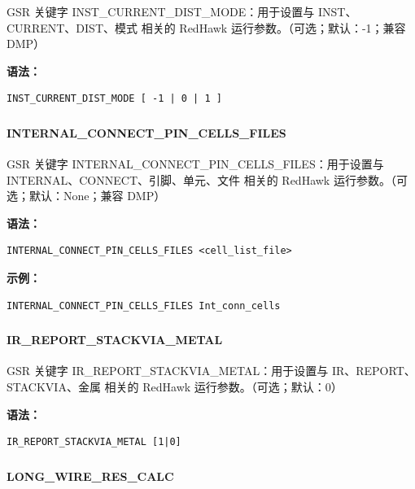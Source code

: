 GSR 关键字 INST_CURRENT_DIST_MODE：用于设置与 INST、CURRENT、DIST、模式 相关的 RedHawk 运行参数。（可选；默认：-1；兼容 DMP）

\textbf{语法：}
\begin{lstlisting}
INST_CURRENT_DIST_MODE [ -1 | 0 | 1 ]
\end{lstlisting}

\subsubsection{}
\paragraph*{INTERNAL_CONNECT_PIN_CELLS_FILES}

GSR 关键字 INTERNAL_CONNECT_PIN_CELLS_FILES：用于设置与 INTERNAL、CONNECT、引脚、单元、文件 相关的 RedHawk 运行参数。（可选；默认：None；兼容 DMP）

\textbf{语法：}
\begin{lstlisting}
INTERNAL_CONNECT_PIN_CELLS_FILES <cell_list_file>
\end{lstlisting}

\textbf{示例：}
\begin{lstlisting}
INTERNAL_CONNECT_PIN_CELLS_FILES Int_conn_cells
\end{lstlisting}

\subsubsection{}
\paragraph*{IR_REPORT_STACKVIA_METAL}

GSR 关键字 IR_REPORT_STACKVIA_METAL：用于设置与 IR、REPORT、STACKVIA、金属 相关的 RedHawk 运行参数。（可选；默认：0）

\textbf{语法：}
\begin{lstlisting}
IR_REPORT_STACKVIA_METAL [1|0]
\end{lstlisting}

\subsubsection{}
\paragraph*{LONG_WIRE_RES_CALC}


